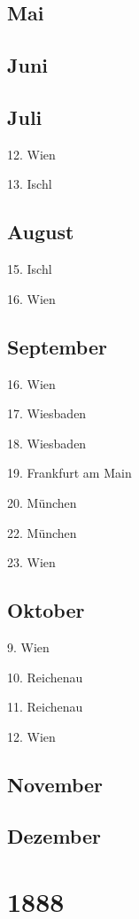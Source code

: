 \documentclass[twoside=false,titlepage=false,open=any, parskip=never, fontsize=10pt, headings=small, chapterprefix=false, appendixprefix=false, DIV=15]{scrbook}
\begin{document}
\begin{multicols}{3}
            \section*{Mai}
            \section*{Juni}
            \section*{Juli}
            12. Wien\par
            13. Ischl\par
            \section*{August}
            15. Ischl\par
            16. Wien\par
            \section*{September}
            16. Wien\par
            17. Wiesbaden\par
            18. Wiesbaden\par
            19. Frankfurt am Main\par
            20. München\par
            22. München\par
            23. Wien\par
            \section*{Oktober}
            9. Wien\par
            10. Reichenau\par
            11. Reichenau\par
            12. Wien\par
            \section*{November}
            \section*{Dezember}
            \chapter*{1888}

\end{multicols}
\end{document}
